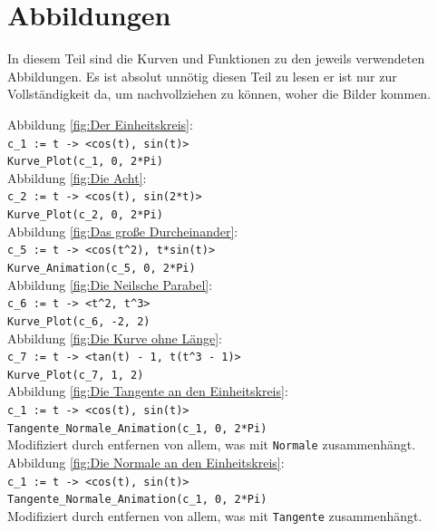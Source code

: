 \documentclass[12pt]{article}
\begin{document}
\newpage

\section{Abbildungen}
In diesem Teil sind die Kurven und Funktionen zu den jeweils verwendeten Abbildungen. Es ist absolut unnötig diesen Teil zu \glqq lesen\grqq{} er ist nur zur Vollständigkeit da, um nachvollziehen zu können, woher die Bilder kommen.
\begin{scriptsize}
Abbildung \ref{fig:Der Einheitskreis}:\\
\texttt{c\_1 := t -> <cos(t), sin(t)>}\\
\texttt{Kurve\_Plot(c\_1, 0, 2*Pi)}\\

Abbildung \ref{fig:Die Acht}:\\
\texttt{c\_2 := t -> <cos(t), sin(2*t)>}\\
\texttt{Kurve\_Plot(c\_2, 0, 2*Pi)}\\

Abbildung \ref{fig:Das große Durcheinander}:\\
\texttt{c\_5 := t -> <cos(t\^{}2), t*sin(t)>}\\
\texttt{Kurve\_Animation(c\_5, 0, 2*Pi)}\\

Abbildung \ref{fig:Die Neilsche Parabel}:\\
\texttt{c\_6 := t -> <t\^{}2, t\^{}3>}\\
\texttt{Kurve\_Plot(c\_6, -2, 2)}\\

Abbildung \ref{fig:Die Kurve ohne Länge}:\\
\texttt{c\_7 := t -> <tan(t) - 1, t(t\^{}3 - 1)>}\\
\texttt{Kurve\_Plot(c\_7, 1, 2)}\\

Abbildung \ref{fig:Die Tangente an den Einheitskreis}:\\
\texttt{c\_1 := t -> <cos(t), sin(t)>}\\
\texttt{Tangente\_Normale\_Animation(c\_1, 0, 2*Pi)}\\
Modifiziert durch entfernen von allem, was mit \texttt{Normale} zusammenhängt.\\

Abbildung \ref{fig:Die Normale an den Einheitskreis}:\\
\texttt{c\_1 := t -> <cos(t), sin(t)>}\\
\texttt{Tangente\_Normale\_Animation(c\_1, 0, 2*Pi)}\\
Modifiziert durch entfernen von allem, was mit \texttt{Tangente} zusammenhängt.\\


\end{scriptsize}
\end{document}
